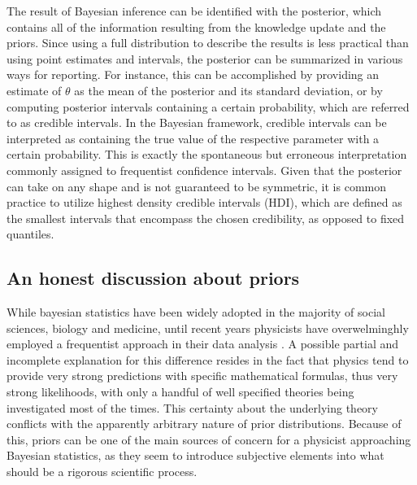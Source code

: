 The result of Bayesian inference can be identified with the posterior, which contains all of the information
resulting from the knowledge update and the priors.
Since using a full distribution to describe the results is less practical than using point estimates and intervals, the
posterior can be summarized in various ways for reporting. For instance, this can be accomplished by providing an
estimate of $\theta$ as the mean of the posterior and its standard deviation, or by computing posterior intervals
containing a certain probability, which are referred to as credible intervals.
In the Bayesian framework, credible intervals can be interpreted as containing the true value of the respective parameter with a certain
probability. This is exactly the spontaneous but erroneous interpretation commonly assigned to frequentist confidence
intervals. Given that the posterior can take on any shape and is not guaranteed to be symmetric, it is common practice
to utilize highest density credible intervals (HDI), which are defined as the smallest intervals that encompass the chosen credibility, as opposed to fixed quantiles.





\subsection{An honest discussion about priors}
While bayesian statistics have been widely adopted in the majority of social sciences, biology and medicine, until recent years
physicists have overwelminghly employed a frequentist approach in their data analysis \cite{cousins1995isn}. 
A possible partial and incomplete explanation for this difference resides in the fact that physics tend to provide very strong predictions with
specific mathematical formulas, thus very strong likelihoods, with only a handful of well specified theories being investigated most of the times.
This certainty about the underlying theory conflicts with the apparently arbitrary nature of prior distributions.
Because of this, priors can be one of the main sources of concern for a physicist approaching Bayesian statistics, as they
seem to introduce subjective elements into what should be a rigorous scientific process.

